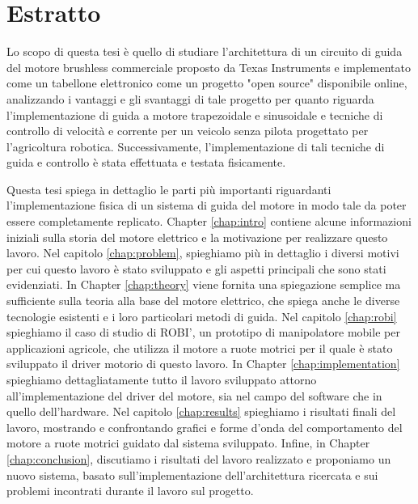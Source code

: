 \newcommand{\estrattoname}{Estratto}
\addcontentsline{toc}{chapter}{\estrattoname}

\begingroup
\let\clearpage\relax
\let\cleardoublepage\relax
\let\cleardoublepage\relax

\chapter*{Estratto}
Lo scopo di questa tesi è quello di studiare l'architettura di un circuito di guida del motore brushless commerciale proposto da Texas Instruments e implementato come un tabellone elettronico come un progetto "open source" disponibile online, analizzando i vantaggi e gli svantaggi di tale progetto per quanto riguarda l'implementazione di guida a motore trapezoidale e sinusoidale e tecniche di controllo di velocità e corrente per un veicolo senza pilota progettato per l'agricoltura robotica. Successivamente, l'implementazione di tali tecniche di guida e controllo è stata effettuata e testata fisicamente.

Questa tesi spiega in dettaglio le parti più importanti riguardanti l'implementazione fisica di un sistema di guida del motore in modo tale da poter essere completamente replicato. Chapter \ref{chap:intro} contiene alcune informazioni iniziali sulla storia del motore elettrico e la motivazione per realizzare questo lavoro. Nel capitolo \ref{chap:problem}, spieghiamo più in dettaglio i diversi motivi per cui questo lavoro è stato sviluppato e gli aspetti principali che sono stati evidenziati. In Chapter \ref{chap:theory} viene fornita una spiegazione semplice ma sufficiente sulla teoria alla base del motore elettrico, che spiega anche le diverse tecnologie esistenti e i loro particolari metodi di guida. Nel capitolo \ref{chap:robi} spieghiamo il caso di studio di ROBI', un prototipo di manipolatore mobile per applicazioni agricole, che utilizza il motore a ruote motrici per il quale è stato sviluppato il driver motorio di questo lavoro. In Chapter \ref{chap:implementation} spieghiamo dettagliatamente tutto il lavoro sviluppato attorno all'implementazione del driver del motore, sia nel campo del software che in quello dell'hardware. Nel capitolo \ref{chap:results} spieghiamo i risultati finali del lavoro, mostrando e confrontando grafici e forme d'onda del comportamento del motore a ruote motrici guidato dal sistema sviluppato. Infine, in Chapter \ref{chap:conclusion}, discutiamo i risultati del lavoro realizzato e proponiamo un nuovo sistema, basato sull'implementazione dell'architettura ricercata e sui problemi incontrati durante il lavoro sul progetto.

\endgroup

